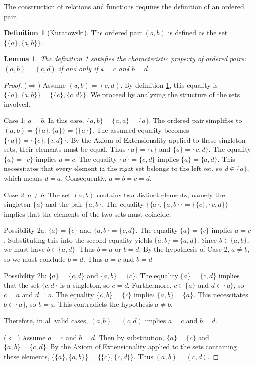 \documentclass[11pt, a4paper]{article}
\theoremstyle{plain}
\newtheorem{lemma}[theorem]{Lemma}
\theoremstyle{definition}
\newtheorem{definition}[theorem]{Definition}
\numberwithin{equation}{section}
\begin{document}
The construction of relations and functions requires the definition of an ordered pair.

\begin{definition}[Kuratowski]\label{def:ordered_pair}
The ordered pair $(a, b)$ is defined as the set $\{\{a\}, \{a, b\}\}$.
\end{definition}

\begin{lemma}\label{lem:ordered_pair_property}
The definition \ref{def:ordered_pair} satisfies the characteristic property of ordered pairs: $(a, b) = (c, d)$ if and only if $a=c$ and $b=d$.
\end{lemma}
\begin{proof}
($\Rightarrow$) Assume $(a, b) = (c, d)$. By definition \ref{def:ordered_pair}, this equality is $\{\{a\}, \{a, b\}\} = \{\{c\}, \{c, d\}\}$. We proceed by analyzing the structure of the sets involved.

Case 1: $a=b$. In this case, $\{a, b\} = \{a, a\} = \{a\}$. The ordered pair simplifies to $(a, b) = \{\{a\}, \{a\}\} = \{\{a\}\}$.
The assumed equality becomes $\{\{a\}\} = \{\{c\}, \{c, d\}\}$. By the Axiom of Extensionality applied to these singleton sets, their elements must be equal. Thus $\{a\} = \{c\}$ and $\{a\} = \{c, d\}$.
The equality $\{a\}=\{c\}$ implies $a=c$.
The equality $\{a\}=\{c, d\}$ implies $\{a\}=\{a, d\}$. This necessitates that every element in the right set belongs to the left set, so $d \in \{a\}$, which means $d=a$.
Consequently, $a=b=c=d$.

Case 2: $a \neq b$. The set $(a, b)$ contains two distinct elements, namely the singleton $\{a\}$ and the pair $\{a, b\}$.
The equality $\{\{a\}, \{a, b\}\} = \{\{c\}, \{c, d\}\}$ implies that the elements of the two sets must coincide.

Possibility 2a: $\{a\} = \{c\}$ and $\{a, b\} = \{c, d\}$.
The equality $\{a\}=\{c\}$ implies $a=c$.
Substituting this into the second equality yields $\{a, b\} = \{a, d\}$.
Since $b \in \{a, b\}$, we must have $b \in \{a, d\}$. Thus $b=a$ or $b=d$. By the hypothesis of Case 2, $a \neq b$, so we must conclude $b=d$.
Thus $a=c$ and $b=d$.

Possibility 2b: $\{a\} = \{c, d\}$ and $\{a, b\} = \{c\}$.
The equality $\{a\} = \{c, d\}$ implies that the set $\{c, d\}$ is a singleton, so $c=d$. Furthermore, $c \in \{a\}$ and $d \in \{a\}$, so $c=a$ and $d=a$.
The equality $\{a, b\} = \{c\}$ implies $\{a, b\} = \{a\}$. This necessitates $b \in \{a\}$, so $b=a$.
This contradicts the hypothesis $a \neq b$.

Therefore, in all valid cases, $(a, b) = (c, d)$ implies $a=c$ and $b=d$.

($\Leftarrow$) Assume $a=c$ and $b=d$. Then by substitution, $\{a\}=\{c\}$ and $\{a, b\}=\{c, d\}$. By the Axiom of Extensionality applied to the sets containing these elements, $\{\{a\}, \{a, b\}\} = \{\{c\}, \{c, d\}\}$. Thus $(a, b) = (c, d)$.
\end{proof}
\end{document}
